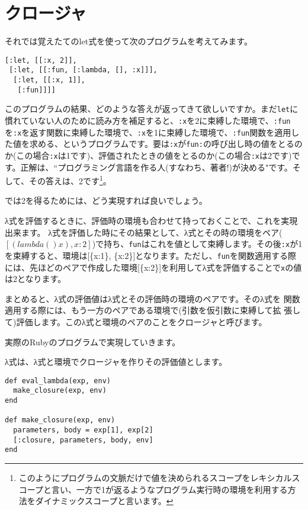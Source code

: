 \section{クロージャ}

それでは覚えたてのlet式を使って次のプログラムを考えてみます。

\begin{lstlisting}
[:let, [[:x, 2]],
 [:let, [[:fun, [:lambda, [], :x]]],
  [:let, [[:x, 1]],
   [:fun]]]]
\end{lstlisting}

このプログラムの結果、どのような答えが返ってきて欲しいですか。まだ{\tt let}に慣れていない人のために読み方を補足すると、{\tt :x}を2に束縛した環境で、{\tt :fun}を{\tt :x}を返す関数に束縛した環境で、{\tt :x}を1に束縛した環境で、{\tt :fun}関数を適用した値を求める、というプログラムです。要は{\tt :x}が{\tt fun:}の呼び出し時の値をとるのか(この場合{\tt :x}は1です)、評価されたときの値をとるのか(この場合{\tt :x}は2です)です。正解は、“プログラミング言語を作る人(すなわち、著者!)が決める"です。そして、その答えは、2です\footnote{このようにプログラムの文脈だけで値を決められるスコープをレキシカルスコープと言い、一方で1が返るようなプログラム実行時の環境を利用する方法をダイナミックスコープと言います。}。

では2を得るためには、どう実現すれば良いでしょう。

λ式を評価するときに、評価時の環境も合わせて持っておくことで、これを実現出来ます。
λ式を評価した時にその結果として、λ式とその時の環境をペア($[(lambda () x), {x:2}]$)で持ち、{\tt fun}はこれを値として束縛します。その後{\tt :x}が1を束縛すると、環境は[\{x:1\}, \{x:2\}]となります。ただし、{\tt fun}を関数適用する際には、先ほどのペアで作成した環境[\{x:2\}]を利用してλ式を評価することで{\tt x}の値は2となります。

まとめると、λ式の評価値はλ式とその評価時の環境のペアです。そのλ式を
関数適用する際には、もう一方のペアである環境で(引数を仮引数に束縛して拡
張して)評価します。このλ式と環境のペアのことをクロージャと呼びます。

実際のRubyのプログラムで実現していきます。

λ式は、λ式と環境でクロージャを作りその評価値とします。

\begin{lstlisting}
def eval_lambda(exp, env)
  make_closure(exp, env)
end

def make_closure(exp, env)
  parameters, body = exp[1], exp[2]
  [:closure, parameters, body, env]
end
\end{lstlisting}


